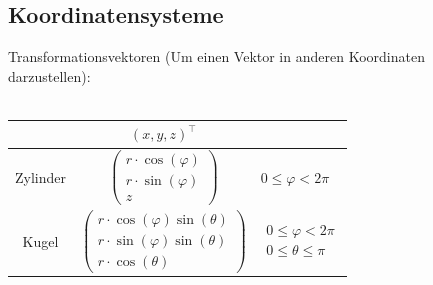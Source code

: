 \documentclass[6pt,a4paper]{scrartcl}
\begin{document}
\begin{multicols*}{4}
    \section{Koordinatensysteme}
    Transformationsvektoren (Um einen Vektor in anderen Koordinaten darzustellen):\\ \\
    \begin{tabular}{c | c  l}
                 & $(x, y, z)^\top$             &                              \\ \midrule
        Zylinder & $\begin{pmatrix} r \cdot \cos (\varphi) \\ r \cdot \sin (\varphi) \\ z \end{pmatrix}$ & $0 \le \varphi < 2 \pi$      \\
        Kugel    & $\begin{pmatrix} r \cdot \cos(\varphi) \sin(\theta) \\ r \cdot \sin(\varphi) \sin(\theta) \\ r \cdot \cos(\theta) \end{pmatrix}$ & $\begin{matrix}0 \le \varphi < 2 \pi \\ 0 \le \theta \le \pi \end{matrix}$
    \end{tabular} \\ \\
    \\


\end{multicols*}
\end{document}
